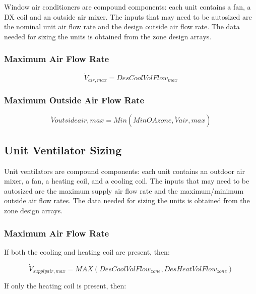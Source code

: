 Window air conditioners are compound components: each unit contains a fan, a DX coil and an outside air mixer. The inputs that may need to be autosized are the nominal unit air flow rate and the design outside air flow rate. The data needed for sizing the units is obtained from the zone design arrays.

\subsubsection{Maximum Air Flow Rate}\label{maximum-air-flow-rate-1}

\begin{equation}
{\dot V_{air,max}} = DesCoolVolFlo{w_{max}}
\end{equation}

\subsubsection{Maximum Outside Air Flow Rate}\label{maximum-outside-air-flow-rate-1}

\begin{equation}
\dot Voutsideair,max = Min(MinOAzone,\dot Vair,max)
\end{equation}

\subsection{Unit Ventilator Sizing}\label{unit-ventilator-sizing}

Unit ventilators are compound components: each unit contains an outdoor air mixer, a fan, a heating coil, and a cooling coil. The inputs that may need to be autosized are the maximum supply air flow rate and the maximum/minimum outside air flow rates. The data needed for sizing the units is obtained from the zone design arrays.

\subsubsection{Maximum Air Flow Rate}\label{maximum-air-flow-rate-2}

If both the cooling and heating coil are present, then:

\begin{equation}
{\dot V_{supplyair,max}} = MAX\left( {DesCoolVolFlo{w_{zone}},DesHeatVolFlo{w_{zone}}} \right)
\end{equation}

If only the heating coil is present, then:

